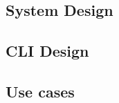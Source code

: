 \subsection{System Design}
\label{sec:system-design}


\subsection{CLI Design}
\label{sec:cli-design}


\subsection{Use cases}
\label{sec:use-cases}


